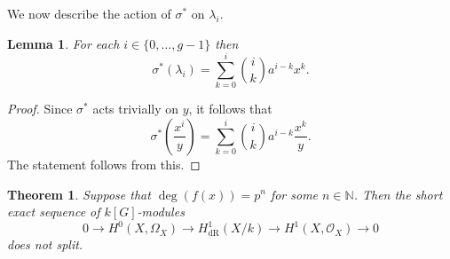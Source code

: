 \documentclass[11pt]{article} %
\theoremstyle{plain}
\newtheorem{thm}[defn]{Theorem}
\newtheorem{lem}[defn]{Lemma}
\theoremstyle{remark}
\newcommand{\ra}{\rightarrow}
\newcommand{\NN}{{\mathbb N}}
\newcommand{\hzero}{{H^0(X,\Omega_X)}}
\newcommand{\hone}{H^1(X,\mathcal{O}_X)}
\newcommand{\derhamhone}{H_{\text {dR}}^1(X/k)}
\begin{document}
We now describe the action of $\sigma^*$ on $\lambda_i$.
\begin{lem}
For each $i \in \{ 0, \ldots, g-1\}$ then 
\[
\sigma^*(\lambda_i) = \sum_{k = 0}^i \binom{i}{k}a^{i-k}x^k.
\]
\end{lem}
\begin{proof}
Since $\sigma^*$ acts trivially on $y$, it follows that
\[
\sigma^*\left( \frac{x^i}{y} \right) = \sum_{k=0}^i \binom{i}{k}a^{i-k}\frac{x^k}{y}.
\]
The statement follows from this.
\end{proof}


\begin{thm}
Suppose that $\deg(f(x)) = p^n $ for some $n \in \NN$.
Then the short exact sequence of $k[G]$-modules
\[
0 \ra \hzero \ra \derhamhone \ra \hone \ra 0
\]
does not split.
\end{thm}
\end{document}
